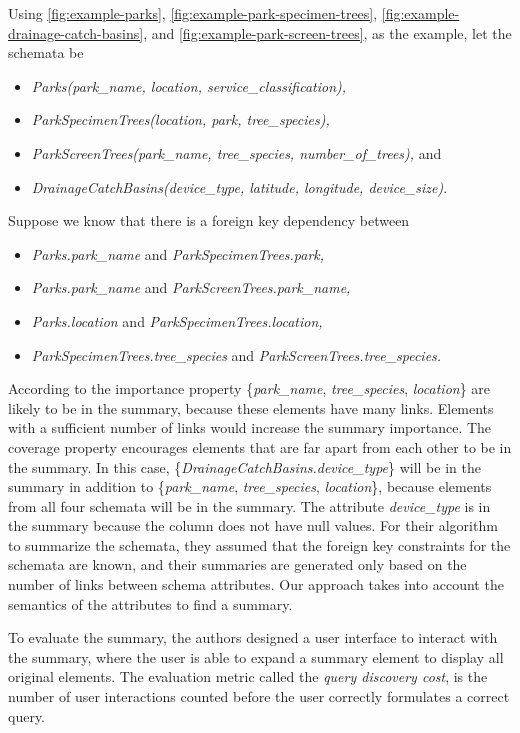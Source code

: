 Using \autoref{fig:example-parks}, \autoref{fig:example-park-specimen-trees}, \autoref{fig:example-drainage-catch-basins}, and \autoref{fig:example-park-screen-trees}, as the example, let the schemata be
\begin{itemize}
	\item[] \textit{Parks(park\_name, location, service\_classification),}
	\item[] \textit{ParkSpecimenTrees(location, park, tree\_species),}
	\item[] \textit{ParkScreenTrees(park\_name, tree\_species, number\_of\_trees),} and 
	\item[] \textit{DrainageCatchBasins(device\_type, latitude, longitude, device\_size)}.
\end{itemize}
Suppose we know that there is a foreign key dependency between
\begin{itemize}
	\item[] \textit{Parks.park\_name} and \textit{ParkSpecimenTrees.park,}
	\item[] \textit{Parks.park\_name} and \textit{ParkScreenTrees.park\_name,}
	\item[] \textit{Parks.location} and \textit{ParkSpecimenTrees.location,}
	\item[] \textit{ParkSpecimenTrees.tree\_species} and \textit{ParkScreenTrees.tree\_species.}
\end{itemize}
According to the importance property \{\textit{park\_name}, \textit{tree\_species}, \textit{location}\} are likely to be in the summary, because these elements have many links. Elements with a sufficient number of links would increase the summary importance. The coverage property encourages elements that are far apart from each other to be in the summary. In this case, \{\textit{DrainageCatchBasins.device\_type}\} will be in the summary in addition to \{\textit{park\_name}, \textit{tree\_species}, \textit{location}\}, because elements from all four schemata will be in the summary. The attribute \textit{device\_type} is in the summary because the column does not have null values. For their algorithm to summarize the schemata, they assumed that the foreign key constraints for the schemata are known, and their summaries are generated only based on the number of links between schema attributes. Our approach takes into account the semantics of the attributes to find a summary.

To evaluate the summary, the authors designed a user interface to interact with the summary, where the user is able to expand a summary element to display all original elements. The evaluation metric called the \textit{query discovery cost}, is the number of user interactions counted before the user correctly formulates a correct query.


